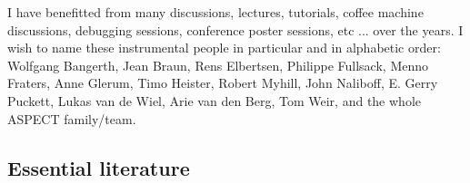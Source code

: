 \documentclass[a4paper]{article}
\begin{document}
I have benefitted from many discussions, lectures, tutorials, coffee machine 
discussions, debugging sessions, conference poster sessions, etc ... 
over the years. I wish to name these instrumental people in particular and 
in alphabetic order: 
Wolfgang Bangerth, 
Jean Braun, 
Rens Elbertsen,
Philippe Fullsack, 
Menno Fraters, 
Anne Glerum,
Timo Heister,
Robert Myhill,
John Naliboff,
E. Gerry Puckett,
Lukas van de Wiel,
Arie van den Berg, 
Tom Weir,
and the whole ASPECT family/team. 



\subsection{Essential literature} %
\end{document}
